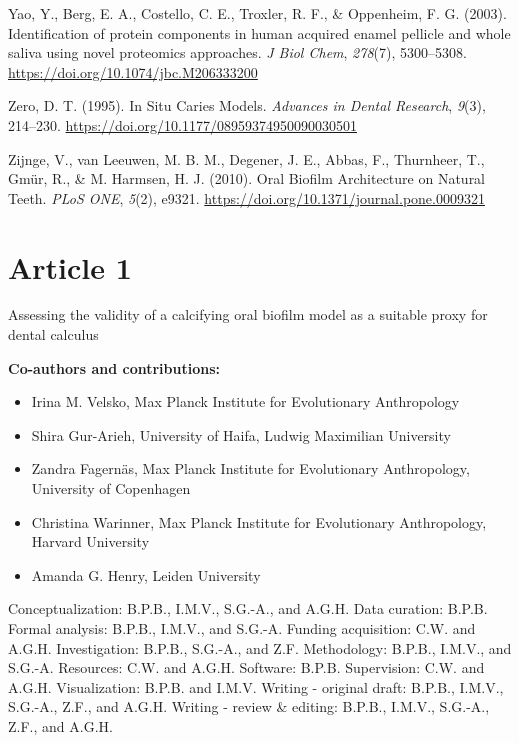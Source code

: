 \documentclass[
  b5paper,
]{book}
\providecommand{\tightlist}{%
  \setlength{\itemsep}{0pt}\setlength{\parskip}{0pt}}
\newlength{\cslhangindent}
\newlength{\cslentryspacingunit} %
\newenvironment{CSLReferences}[2] %
 {%
  \setlength{\parindent}{0pt}
  \ifodd #1
  \let\oldpar\par
  \def\par{\hangindent=\cslhangindent\oldpar}
  \fi
  \setlength{\parskip}{#2\cslentryspacingunit}
 }%
 {}
\begin{document}
\begin{CSLReferences}{1}{0}
\leavevmode{}%
Yao, Y., Berg, E. A., Costello, C. E., Troxler, R. F., \& Oppenheim, F.
G. (2003). Identification of protein components in human acquired enamel
pellicle and whole saliva using novel proteomics approaches. \emph{J
Biol Chem}, \emph{278}(7), 5300--5308.
\url{https://doi.org/10.1074/jbc.M206333200}

\leavevmode{}%
Zero, D. T. (1995). In {Situ Caries Models}. \emph{Advances in Dental
Research}, \emph{9}(3), 214--230.
\url{https://doi.org/10.1177/08959374950090030501}

\leavevmode{}%
Zijnge, V., van Leeuwen, M. B. M., Degener, J. E., Abbas, F., Thurnheer,
T., Gmür, R., \& M. Harmsen, H. J. (2010). Oral {Biofilm Architecture}
on {Natural Teeth}. \emph{PLoS ONE}, \emph{5}(2), e9321.
\url{https://doi.org/10.1371/journal.pone.0009321}

\end{CSLReferences}


\hypertarget{byoc-valid}{%
\chapter{Article 1}\label{byoc-valid}}

Assessing the validity of a calcifying oral biofilm model as a suitable
proxy for dental calculus

\hfill\break

\footnotesize

\textbf{Co-authors and contributions:}

\begin{itemize}
\tightlist
\item
  Irina M. Velsko, Max Planck Institute for Evolutionary Anthropology
\item
  Shira Gur-Arieh, University of Haifa, Ludwig Maximilian University
\item
  Zandra Fagernäs, Max Planck Institute for Evolutionary Anthropology,
  University of Copenhagen
\item
  Christina Warinner, Max Planck Institute for Evolutionary
  Anthropology, Harvard University
\item
  Amanda G. Henry, Leiden University
\end{itemize}

Conceptualization: B.P.B., I.M.V., S.G.-A., and A.G.H. Data curation:
B.P.B. Formal analysis: B.P.B., I.M.V., and S.G.-A. Funding acquisition:
C.W. and A.G.H. Investigation: B.P.B., S.G.-A., and Z.F. Methodology:
B.P.B., I.M.V., and S.G.-A. Resources: C.W. and A.G.H. Software: B.P.B.
Supervision: C.W. and A.G.H. Visualization: B.P.B. and I.M.V. Writing -
original draft: B.P.B., I.M.V., S.G.-A., Z.F., and A.G.H. Writing -
review \& editing: B.P.B., I.M.V., S.G.-A., Z.F., and A.G.H.
\end{document}
